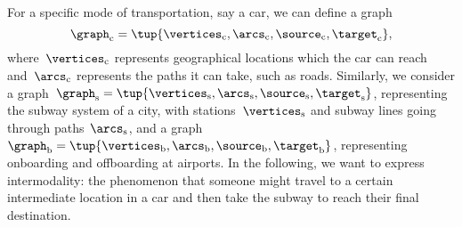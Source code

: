 

\section{}


For a specific mode of transportation, say a car, we can define a graph
\begin{equation*}
    \graph_\mathrm{c}=\tup{\vertices_\mathrm{c},\arcs_\mathrm{c},\source_\mathrm{c},\target_\mathrm{c}},
\end{equation*}
where~$\vertices_\mathrm{c}$ represents geographical locations which the car can reach and~$\arcs_\mathrm{c}$ represents the paths it can take, such as roads.
Similarly, we consider a graph~$\graph_\mathrm{s}=\tup{\vertices_\mathrm{s},\arcs_\mathrm{s},\source_\mathrm{s},\target_\mathrm{s}}$, representing the subway system of a city, with stations~$\vertices_\mathrm{s}$ and subway lines going through paths~$\arcs_\mathrm{s}$, and a graph $\graph_\mathrm{b}=\tup{\vertices_\mathrm{b},\arcs_\mathrm{b},\source_\mathrm{b},\target_\mathrm{b}}$, representing onboarding and offboarding at airports.
In the following, we want to express intermodality: the phenomenon that someone might travel to a certain intermediate location in a car and then take the subway to reach their final destination.

